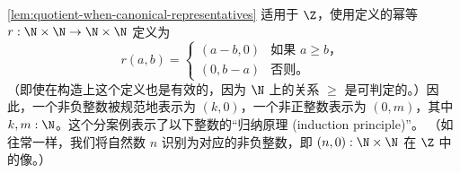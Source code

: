 \begin{rmk}\label{Z-quotient-by-canonical-representatives}
\cref{lem:quotient-when-canonical-representatives} 适用于 $\Z$，使用定义的幂等 $r : \N \times \N \to \N \times \N$
定义为
%
\begin{equation*}
  r(a, b) =
  \begin{cases}
  (a - b, 0) & \text{如果 } a \geq b，\\
  (0, b - a) & \text{否则。}
  \end{cases}
\end{equation*}
%
（即使在构造上这个定义也是有效的，因为 $\N$ 上的关系 $\geq$ 是可判定的。）因此，一个非负整数被规范地表示为 $(k, 0)$，一个非正整数表示为 $(0, m)$，其中 $k,m:\N$。这个分案例表示了以下整数的“归纳原理 (induction principle)”。
%
（如往常一样，我们将自然数 $n$ 识别为对应的非负整数，即 $(n,0):\N\times\N$ 在 $\Z$ 中的像。）
\end{rmk}

